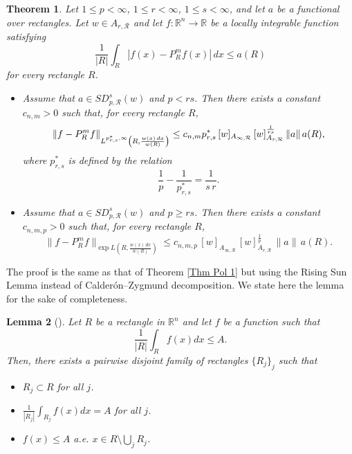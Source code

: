 \documentclass[reqno, 10pt, oneside]{amsart}
\numberwithin{equation}{section}
\newcommand{\strt}[1]{\rule{0pt}{#1}}
\newtheorem{theorem}{Theorem}
\newtheorem{lemma}[theorem]{Lemma}
\numberwithin{theorem}{section}
\newcommand{\R}{{\mathbb R}}
\newcommand{\norm}[1]{\left\|#1\right\|}
\newcommand{\1}{{\rm 1\hspace*{-0.4ex}%
\rule{0.1ex}{1.52ex}\hspace*{0.2ex}}}
\begin{document}
\begin{theorem}\label{Thm Rectangles}
	Let $1 \le p < \infty$, $1 \le r < \infty$, $1\le s<\infty$, and let $a$ be a functional over rectangles. Let $w\in A_{r,\mathcal{R}}$ and let $f:\R^n \longrightarrow \R$ be a locally integrable function satisfying
	\begin{equation*}
		\frac{1}{|R|}\int_R |f(x)-P_R^mf(x)|\,dx \le a(R)
	\end{equation*}
	for every rectangle $R$.
	
	\begin{itemize}
		\item Assume that $a\in SD_{p,\mathcal{R}}^s(w)$ and $p<rs$. Then there exists a constant $c_{n,m}>0$ such that, for every rectangle $R$,
		\begin{equation*}
			\norm{f-P_R^mf}_{\strt{2.3ex} L^{p_{r,s}^{*},\infty}\left(R, \frac{w(x)\,dx}{w(R)}\right)}
			\le
			c_{n,m} p_{r,s}^{*}\,[w]_{A_{\infty,\mathcal{R}}}\,[w]_{A_{r,\mathcal{R}}}^{\frac{1}{rs}}\,
			\|a\|\,a(R),
		\end{equation*}
		where $p_{r,s}^{*}$ is defined by the relation
		\begin{equation*}
			\frac{1}{p}-\frac{1}{p_{r,s}^{*}}=\frac{1}{s\,r}.
		\end{equation*}
		
		\item Assume that $a\in SD_{p,\mathcal{R}}^s(w)$ and $p\ge rs$. Then there exists a constant $c_{n,m,p}>0$ such that, for every rectangle $R$,
		\begin{equation*}
			\|f-P_R^mf\|_{\exp L\left(R,\frac{w(x)\,dx}{w(R)}\right)}
			\le
			c_{n, m,p}\,[w]_{A_{\infty,\mathcal{R}}}\,[w]_{A_{r,\mathcal{R}}}^{\frac1p}\,
			\|a\|\,a(R).
		\end{equation*}
	\end{itemize}
\end{theorem}

The proof is the same as that of Theorem \ref{Thm Pol 1} but using the Rising Sun Lemma instead of Calderón--Zygmund decomposition. We state here the lemma for the sake of completeness.
		
	\begin{lemma}[\cite{KLS}]
		Let $R$ be a rectangle in $\R^n$ and let $f$ be a function such that 
		\begin{equation*}
			\frac{1}{|R|}\int_R f(x)dx \le A.
		\end{equation*}
		Then, there exists a pairwise disjoint family of rectangles $\{R_j\}_j$ such that
		\begin{itemize}
			\item $R_j\subset R$ for all $j$.
			\item $\frac{1}{|R_j|}\int_{R_j} f(x)dx = A$ for all $j$.
			\item $f(x)\le A$ a.e. $x\in R\setminus \bigcup_j R_j$. 
		\end{itemize}
	\end{lemma} 
\end{document}
